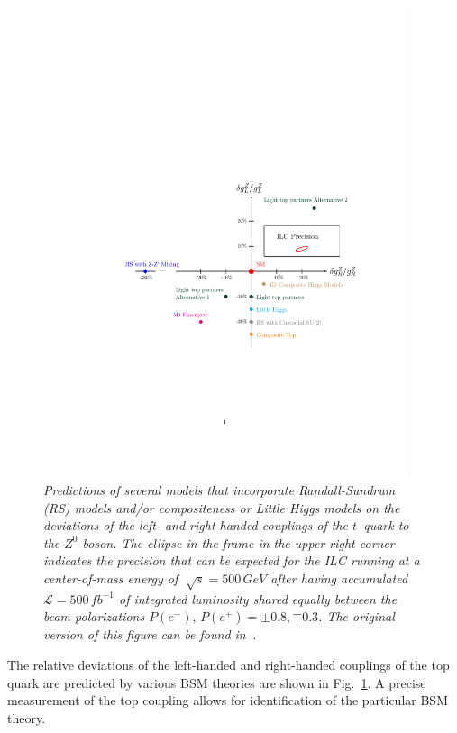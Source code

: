 \begin{figure}[h]
	{\centering
		\includegraphics[clip, trim=4cm 7cm 2cm 10cm, width=0.95\textwidth]{ILD/graphics/plot.pdf}
		\caption{\sl Predictions of several models that incorporate Randall-Sundrum (RS) models and/or compositeness or Little Higgs models on the deviations of the left- and right-handed couplings of the $t$~quark to the $Z^0$ boson. The ellipse in the frame in the upper right corner indicates the precision that can be expected for the ILC running at a center-of-mass energy of $\sqrt[]{s} = 500\,GeV$ after having accumulated ${\mathcal L}=500\,fb^{-1}$ of integrated luminosity shared equally between the beam polarizations $P(e^-),\,P(e^+) =\pm0.8,\mp0.3$. The original version of this figure can be found in~\cite{bib:ILCTOP}.}
		\label{fig:DeviationsTop}
	}
\end{figure}

The relative deviations of the left-handed and right-handed couplings of the top quark are predicted by various BSM theories are shown in Fig.~\ref{fig:DeviationsTop}.
A precise measurement of the top coupling allows for identification of the particular BSM theory.
  

